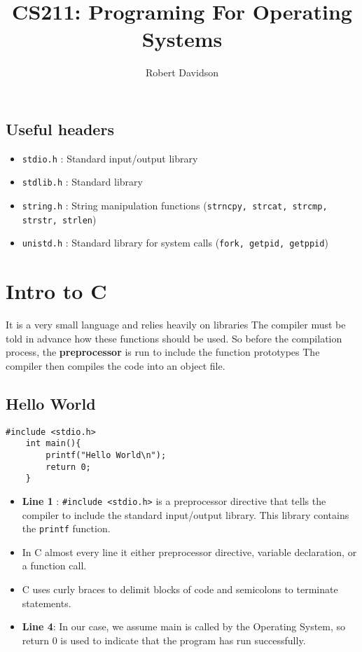 \documentclass[a4paper, 10pt]{article}
\title{
\textbf{CS211: Programing For Operating Systems} \\ 
}
\author{
Robert Davidson
}
\date{}
\begin{document}
\maketitle
\pagebreak

\tableofcontents
\pagebreak
\subsection*{Useful headers}
\begin{itemize}
    \item \texttt{stdio.h} : Standard input/output library
    \item \texttt{stdlib.h} : Standard library
    \item  \texttt{string.h} : String manipulation functions (\texttt{strncpy, strcat, strcmp, strstr, strlen})
    \item \texttt{unistd.h} : Standard library for system calls (\texttt{fork, getpid, getppid})
\end{itemize}

\pagebreak
\section{Intro to C}

It is a very small language and relies heavily on libraries
The compiler must be told in advance how these functions should be used. So before the compilation process, the \textbf{preprocessor} is run to include the function prototypes The compiler then compiles the code into an object file.

\subsection{Hello World}
\begin{lstlisting}[style=cStyle, caption={Hello World in C}]
    #include <stdio.h>
    int main(){
        printf("Hello World\n");
        return 0;
    }
    \end{lstlisting}
\begin{itemize}
    \item \textbf{Line 1} : \texttt{\#include <stdio.h>} is a preprocessor directive that tells the compiler to include the standard input/output library. This library contains the \texttt{printf} function.
    \item In C almost every line it either preprocessor directive, variable declaration, or a function call.
    \item C uses curly braces to delimit blocks of code and semicolons to terminate statements.
    \item \textbf{Line 4}: In our case, we assume main is called by the Operating System, so return 0 is used to indicate that the program has run successfully.
\end{itemize}
\end{document}
